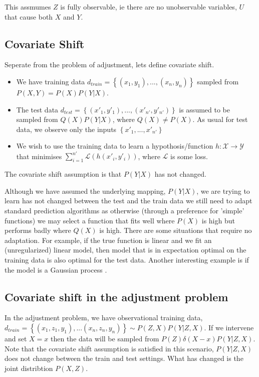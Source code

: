 \documentclass{article}
\newcommand{\set}[1]{\left\{#1\right\}}
\theoremstyle{plain}
\theoremstyle{definition}
\begin{document}
This assmumes $Z$ is fully observable, ie there are no unobservable variables, $U$ that cause both $X$ and $Y$. 

\subsection*{Covariate Shift}

Seperate from the problem of adjustment, lets define covariate shift.

\begin{itemize}
\item We have training data $d_{train} = \set{(x_1,y_1),...,(x_n,y_n)}$ sampled from $P(X,Y) = P(X)P(Y|X)$.
\item The test data $d_{test} = \set{(x'_1,y'_1),...,(x'_{n'},y'_{n'})}$ is assumed to be sampled from $Q(X)P(Y|X)$, where $Q(X) \neq P(X)$. As usual for test data, we observe only the inputs $\set{x'_1,...,x'_{n'}}$
\item We wish to use the training data to learn a hypothosis/function $h:\mathcal{X} \rightarrow \mathcal{Y}$ that minimises $\sum_{i = 1}^{n'}\mathcal{L}(h(x'_i,y'_i))$, where $\mathcal{L}$ is some loss.
\end{itemize}

The covariate shift assumption is that $P(Y|X)$ has not changed. 


Although we have assumed the underlying mapping, $P(Y|X)$, we are trying to learn has not changed between the test and the train data we still need to adapt standard prediction algorithms as otherwise (through a preference for 'simple' functions) we may select a function that fits well where $P(X)$ is high but performs badly where $Q(X)$ is high. There are some situations that require no adaptation. For example, if the true function is linear and we fit an (unregularized) linear model, then model that is in expectation optimal on the training data is also optimal for the test data. Another interesting example is if the model is a Gaussian process \cite{}. 

\subsection*{Covariate shift in the adjustment problem}

In the adjustment problem, we have observational training data, $d_{train} = \set{(x_1,z_1,y_1),...(x_n,z_n,y_n)} \sim P(Z,X)P(Y|Z,X)$. If we intervene and set $X=x$ then the data will be sampled from $P(Z)\delta(X-x)P(Y|Z,X)$. Note that the covariate shift assumption is satisfied in this scenario, $P(Y|Z,X)$ does not change between the train and test settings. What has changed is the joint distribtion $P(X,Z)$.
\end{document}
